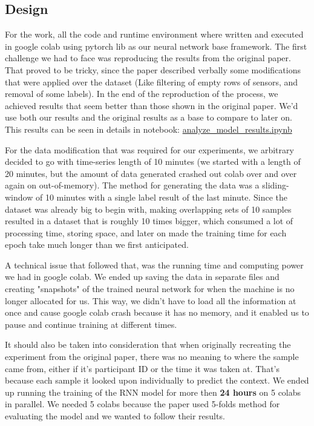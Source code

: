\documentclass{article}
\begin{document}
\subsection{Design}
For the work, all the code and runtime environment where written and executed in google colab using pytorch lib as our neural network base framework. The first challenge we had to face was reproducing the results from the original paper. That proved to be tricky, since the paper described verbally some modifications that were applied over the dataset (Like filtering of empty rows of sensors, and removal of some labels). In the end of the reproduction of the process, we achieved results that seem better than those shown in the original paper. We'd use both our results and the original results as a base to compare to later on.
This results can be seen in details in notebook: \href{https://colab.research.google.com/drive/18adUIvkYi8E6JQyZsbEtx6wgEXZr3hnX#scrollTo=cweKasXbbpH6}{analyze\_model\_results.ipynb} \par
For the data modification that was required for our experiments, we arbitrary decided to go with time-series length of 10 minutes (we started with a length of 20 minutes, but the amount of data generated crashed out colab over and over again on out-of-memory).
The method for generating the data was a sliding-window of 10 minutes with a single label result of the last minute.
Since the dataset was already big to begin with, making overlapping sets of 10 samples resulted in a dataset that is roughly 10 times bigger, which consumed a lot of processing time, storing space, and later on made the training time for each epoch take much longer than we first anticipated.\par
A technical issue that followed that, was the running time and computing power we had in google colab. We ended up saving the data in separate files and creating "snapshots" of the trained neural network for when the machine is no longer allocated for us. This way, we didn't have to load all the information at once and cause google colab crash because it has no memory, and it enabled us to pause and continue training at different times.\par
It should also be taken into consideration that when originally recreating the experiment from the original paper, there was no meaning to where the sample came from, either if it's participant ID or the time it was taken at. That's because each sample it looked upon individually to predict the context.
We ended up running the training of the RNN model for more then \textbf{24 hours} on 5 colabs in parallel.
We needed 5 colabs because the paper used 5-folds method for evaluating the model and we wanted to follow their results.
\end{document}
